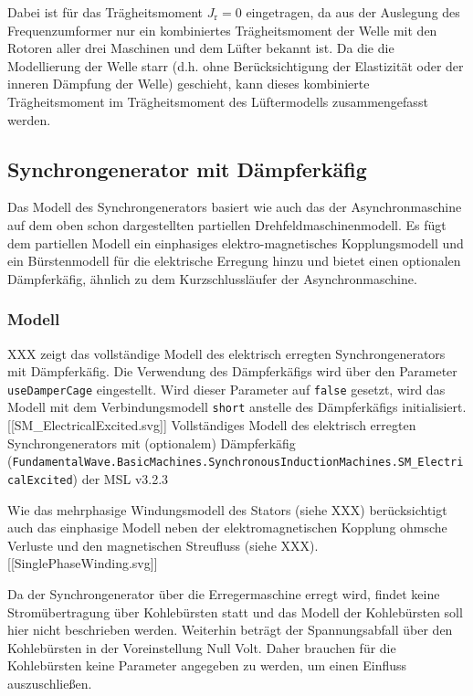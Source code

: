 Dabei ist für das Trägheitsmoment \(J_{\mathrm{r}}=0\) eingetragen, da
aus der Auslegung des Frequenzumformer nur ein kombiniertes
Trägheitsmoment der Welle mit den Rotoren aller drei Maschinen und dem
Lüfter bekannt ist. Da die die Modellierung der Welle starr (d.h. ohne
Berücksichtigung der Elastizität oder der inneren Dämpfung der Welle)
geschieht, kann dieses kombinierte Trägheitsmoment im Trägheitsmoment
des Lüftermodells zusammengefasst werden.

\hypertarget{synchrongenerator-mit-duxe4mpferkuxe4fig}{%
\subsection{Synchrongenerator mit
Dämpferkäfig}\label{synchrongenerator-mit-duxe4mpferkuxe4fig}}

Das Modell des Synchrongenerators basiert wie auch das der
Asynchronmaschine auf dem oben schon dargestellten partiellen
Drehfeldmaschinenmodell. Es fügt dem partiellen Modell ein einphasiges
elektro-magnetisches Kopplungsmodell und ein Bürstenmodell für die
elektrische Erregung hinzu und bietet einen optionalen Dämpferkäfig,
ähnlich zu dem Kurzschlussläufer der Asynchronmaschine.

\hypertarget{modell-1}{%
\subsubsection{Modell}\label{modell-1}}

XXX zeigt das vollständige Modell des elektrisch erregten
Synchrongenerators mit Dämpferkäfig. Die Verwendung des Dämpferkäfigs
wird über den Parameter \texttt{useDamperCage} eingestellt. Wird dieser
Parameter auf \texttt{false} gesetzt, wird das Modell mit dem
Verbindungsmodell \texttt{short} anstelle des Dämpferkäfigs
initialisiert. {[}{[}SM\_ElectricalExcited.svg{]}{]} Vollständiges
Modell des elektrisch erregten Synchrongenerators mit (optionalem)
Dämpferkäfig
(\texttt{FundamentalWave.BasicMachines.SynchronousInductionMachines.SM\_ElectricalExcited})
der MSL v3.2.3

Wie das mehrphasige Windungsmodell des Stators (siehe XXX)
berücksichtigt auch das einphasige Modell neben der elektromagnetischen
Kopplung ohmsche Verluste und den magnetischen Streufluss (siehe XXX).
{[}{[}SinglePhaseWinding.svg{]}{]}

Da der Synchrongenerator über die Erregermaschine erregt wird, findet
keine Stromübertragung über Kohlebürsten statt und das Modell der
Kohlebürsten soll hier nicht beschrieben werden. Weiterhin beträgt der
Spannungsabfall über den Kohlebürsten in der Voreinstellung Null Volt.
Daher brauchen für die Kohlebürsten keine Parameter angegeben zu werden,
um einen Einfluss auszuschließen.

